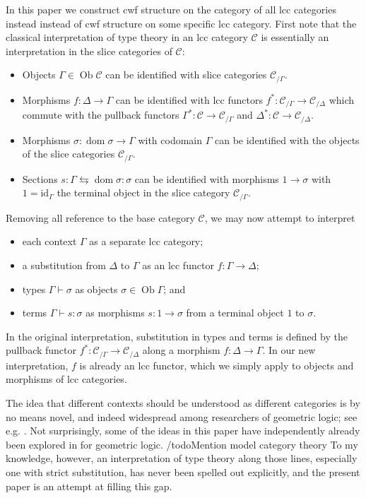 \documentclass[a4paper]{article}
\theoremstyle{remark}
\theoremstyle{definition}
\begin{document}
In this paper we construct cwf structure on the category of all lcc categories instead instead of cwf structure on some specific lcc category.
First note that the classical interpretation of type theory in an lcc category $\mathcal{C}$ is essentially an interpretation in the slice categories of $\mathcal{C}$:
\begin{itemize}
  \item
    Objects $\Gamma \in \operatorname{Ob} \mathcal{C}$ can be identified with slice categories $\mathcal{C}_{/ \Gamma}$.
  \item
    Morphisms $f : \Delta \rightarrow \Gamma$ can be identified with lcc functors $f^* : \mathcal{C}_{/ \Gamma} \rightarrow \mathcal{C}_{/ \Delta}$ which commute with the pullback functors $\Gamma^* : \mathcal{C} \rightarrow \mathcal{C}_{/ \Gamma}$ and $\Delta^* : \mathcal{C} \rightarrow \mathcal{C}_{/ \Delta}$.
  \item
    Morphisms $\sigma : \operatorname{dom} \sigma \rightarrow \Gamma$ with codomain $\Gamma$ can be identified with the objects of the slice categories $\mathcal{C}_{/ \Gamma}$.
  \item
    Sections $s : \Gamma \leftrightarrows \operatorname{dom} \sigma : \sigma$ can be identified with morphisms $1 \rightarrow \sigma$ with $1 = \mathrm{id}_\Gamma$ the terminal object in the slice category $\mathcal{C}_{/ \Gamma}$.
\end{itemize}
Removing all reference to the base category $\mathcal{C}$, we may now attempt to interpret
\begin{itemize}
  \item
    each context $\Gamma$ as a separate lcc category;
  \item
    a substitution from $\Delta$ to $\Gamma$ as an lcc functor $f : \Gamma \rightarrow \Delta$;
  \item
    types $\Gamma \vdash \sigma$ as objects $\sigma \in \operatorname{Ob} \Gamma$; and
  \item
    terms $\Gamma \vdash s : \sigma$ as morphisms $s : 1 \rightarrow \sigma$ from a terminal object $1$ to $\sigma$.
\end{itemize}
In the original interpretation, substitution in types and terms is defined by the pullback functor $f^* : \mathcal{C}_{/ \Gamma} \rightarrow \mathcal{C}_{/ \Delta}$ along a morphism $f : \Delta \rightarrow \Gamma$.
In our new interpretation, $f$ is already an lcc functor, which we simply apply to objects and morphisms of lcc categories.

The idea that different contexts should be understood as different categories is by no means novel, and indeed widespread among researchers of geometric logic; see e.g. \citet[section 4.5]{locales-and-toposes-as-spaces}.
Not surprisingly, some of the ideas in this paper have independently already been explored in \citet{au-sketches} for geometric logic.
/todo{Mention model category theory}
To my knowledge, however, an interpretation of type theory along those lines, especially one with strict substitution, has never been spelled out explicitly, and the present paper is an attempt at filling this gap.
\end{document}
